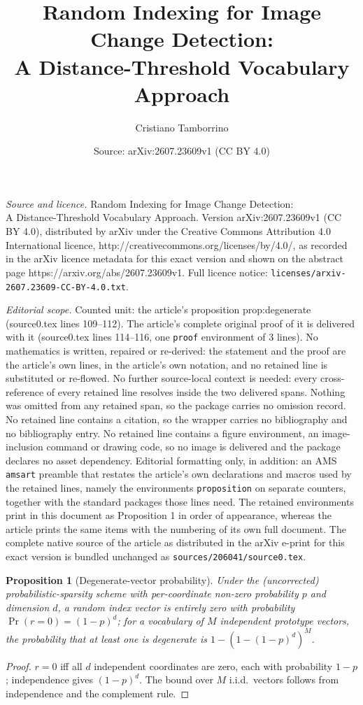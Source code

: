 \documentclass[10pt,a4paper]{amsart}
\title{Random Indexing for Image Change Detection: \\ A Distance-Threshold Vocabulary Approach}
\author{Cristiano Tamborrino}
\date{Source: arXiv:2607.23609v1 (CC BY 4.0)}
\newtheorem{proposition}{Proposition}
\begin{document}
\maketitle

\noindent\emph{Source and licence.} Random Indexing for Image Change Detection: \\ A Distance-Threshold Vocabulary Approach. Version arXiv:2607.23609v1 (CC BY 4.0), distributed by arXiv under the Creative Commons Attribution 4.0 International licence, http://creativecommons.org/licenses/by/4.0/, as recorded in the arXiv licence metadata for this exact version and shown on the abstract page https://arxiv.org/abs/2607.23609v1. Full licence notice: \texttt{licenses/arxiv-2607.23609-CC-BY-4.0.txt}.\par\smallskip

\noindent\textit{Editorial scope.} Counted unit: the article's proposition prop:degenerate (source0.tex lines 109--112). The article's complete original proof of it is delivered with it (source0.tex lines 114--116, one \texttt{proof} environment of 3 lines). No mathematics is written, repaired or re-derived: the statement and the proof are the article's own lines, in the article's own notation, and no retained line is substituted or re-flowed.  No further source-local context is needed: every cross-reference of every retained line resolves inside the two delivered spans.  Nothing was omitted from any retained span, so the package carries no omission record.  No retained line contains a citation, so the wrapper carries no bibliography and no bibliography entry.  No retained line contains a figure environment, an image-inclusion command or drawing code, so no image is delivered and the package declares no asset dependency.  Editorial formatting only, in addition: an AMS \texttt{amsart} preamble that restates the article's own declarations and macros used by the retained lines, namely the environments \texttt{proposition} on separate counters, together with the standard packages those lines need.  The retained environments print in this document as Proposition 1 in order of appearance, whereas the article prints the same items with the numbering of its own full document.  The complete native source of the article as distributed in the arXiv e-print for this exact version is bundled unchanged as \texttt{sources/206041/source0.tex}.
\begin{proposition}[Degenerate-vector probability]
\label{prop:degenerate}
Under the (uncorrected) probabilistic-sparsity scheme with per-coordinate non-zero probability $p$ and dimension $d$, a random index vector is entirely zero with probability $\Pr(r=0)=(1-p)^d$; for a vocabulary of $M$ independent prototype vectors, the probability that at least one is degenerate is $1-(1-(1-p)^d)^M$.
\end{proposition}

\begin{proof}
$r=0$ iff all $d$ independent coordinates are zero, each with probability $1-p$; independence gives $(1-p)^d$. The bound over $M$ i.i.d.\ vectors follows from independence and the complement rule. \qedhere
\end{proof}
\end{document}

